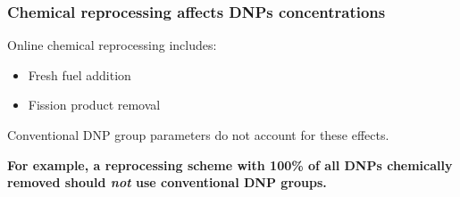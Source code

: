 \begin{frame}
	\frametitle{Chemical reprocessing affects \glspl{DNP} concentrations}
	\begin{block}{Online chemical reprocessing includes:}
	\begin{itemize}
		\item Fresh fuel addition
		\item Fission product removal
	\end{itemize}
	\end{block}

	Conventional \gls{DNP} group parameters do not account for these effects.
	\vspace{2mm}

	\textbf{For example, a reprocessing scheme with 100\% of all \glspl{DNP} chemically removed should \textit{not} use conventional \gls{DNP} groups.}
\end{frame}
